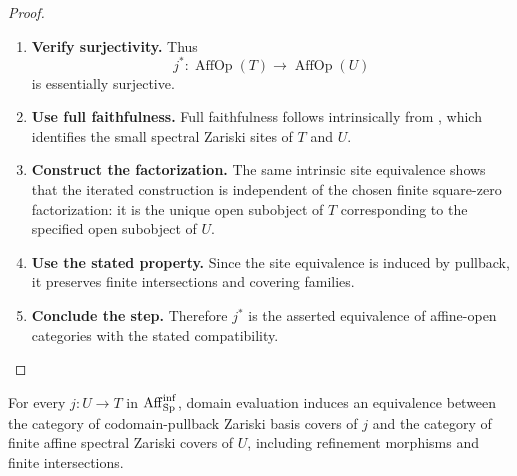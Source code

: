 \begin{proof}
\begin{enumerate}[label=\textup{(\arabic*)}]
    \item \textbf{Verify surjectivity.}
    Thus
    \[
        j^*:
        \operatorname{AffOp}(T)
        \longrightarrow
        \operatorname{AffOp}(U)
    \]
    is essentially surjective.

    \item \textbf{Use full faithfulness.}
    Full faithfulness follows intrinsically from
    , which identifies the small spectral
    Zariski sites of \(T\) and \(U\).

    \item \textbf{Construct the factorization.}
    The same intrinsic site equivalence shows that the iterated construction is independent of
    the chosen finite square-zero factorization: it is the unique open subobject of \(T\)
    corresponding to the specified open subobject of \(U\).

    \item \textbf{Use the stated property.}
    Since the site equivalence is induced by pullback, it preserves finite intersections and
    covering families.

    \item \textbf{Conclude the step.}
    Therefore \(j^*\) is the asserted equivalence of affine-open categories with the stated
    compatibility.
\end{enumerate}
\end{proof}

\begin{proposition}
\label{prop:source-classification-infinitesimal-zariski}
For every \(j:U\to T\) in \(\operatorname{Aff}_{\operatorname{Sp}}^{\inf}\), domain evaluation induces
an equivalence between the category of codomain-pullback Zariski basis covers of
\(j\) and the category of finite affine spectral Zariski covers of \(U\),
including refinement morphisms and finite intersections.
\end{proposition}

